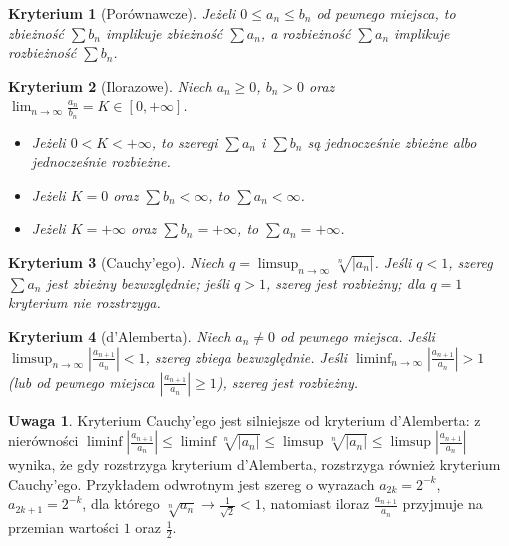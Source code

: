 \documentclass[11pt, a4paper]{article}
\theoremstyle{plain}
\newtheorem*{kryterium}{Kryterium}
\theoremstyle{definition}
\newtheorem*{uwaga}{Uwaga}
\begin{document}
\begin{kryterium}[Porównawcze]
Jeżeli $0 \leqslant a_n \leqslant b_n$ od pewnego miejsca, to zbieżność $\sum b_n$ implikuje zbieżność $\sum a_n$, a rozbieżność $\sum a_n$ implikuje rozbieżność $\sum b_n$.
\end{kryterium}

\begin{kryterium}[Ilorazowe]
Niech $a_n \geqslant 0$, $b_n > 0$ oraz $\lim_{n\to\infty} \frac{a_n}{b_n} = K \in [0, +\infty]$.
\begin{itemize}
    \item Jeżeli $0 < K < +\infty$, to szeregi $\sum a_n$ i $\sum b_n$ są jednocześnie zbieżne albo jednocześnie rozbieżne.
    \item Jeżeli $K = 0$ oraz $\sum b_n < \infty$, to $\sum a_n < \infty$.
    \item Jeżeli $K = +\infty$ oraz $\sum b_n = +\infty$, to $\sum a_n = +\infty$.
\end{itemize}
\end{kryterium}

\begin{kryterium}[Cauchy'ego]
Niech $q = \limsup_{n\to\infty} \sqrt[n]{\lvert a_n \rvert}$. Jeśli $q < 1$, szereg $\sum a_n$ jest zbieżny bezwzględnie; jeśli $q > 1$, szereg jest rozbieżny; dla $q = 1$ kryterium nie rozstrzyga.
\end{kryterium}

\begin{kryterium}[d'Alemberta]
Niech $a_n \neq 0$ od pewnego miejsca. Jeśli $\limsup_{n\to\infty} \left\lvert \frac{a_{n+1}}{a_n} \right\rvert < 1$, szereg zbiega bezwzględnie. Jeśli $\liminf_{n\to\infty} \left\lvert \frac{a_{n+1}}{a_n} \right\rvert > 1$ (lub od pewnego miejsca $\left\lvert \frac{a_{n+1}}{a_n} \right\rvert \geqslant 1$), szereg jest rozbieżny.
\end{kryterium}

\begin{uwaga}
Kryterium Cauchy'ego jest silniejsze od kryterium d'Alemberta: z nierówności $\liminf \left\lvert \frac{a_{n+1}}{a_n} \right\rvert \leqslant \liminf \sqrt[n]{\lvert a_n \rvert} \leqslant \limsup \sqrt[n]{\lvert a_n \rvert} \leqslant \limsup \left\lvert \frac{a_{n+1}}{a_n} \right\rvert$ wynika, że gdy rozstrzyga kryterium d'Alemberta, rozstrzyga również kryterium Cauchy'ego. Przykładem odwrotnym jest szereg o wyrazach $a_{2k} = 2^{-k}$, $a_{2k+1} = 2^{-k}$, dla którego $\sqrt[n]{a_n} \to \frac{1}{\sqrt{2}} < 1$, natomiast iloraz $\frac{a_{n+1}}{a_n}$ przyjmuje na przemian wartości $1$ oraz $\frac{1}{2}$.
\end{uwaga}
\end{document}
